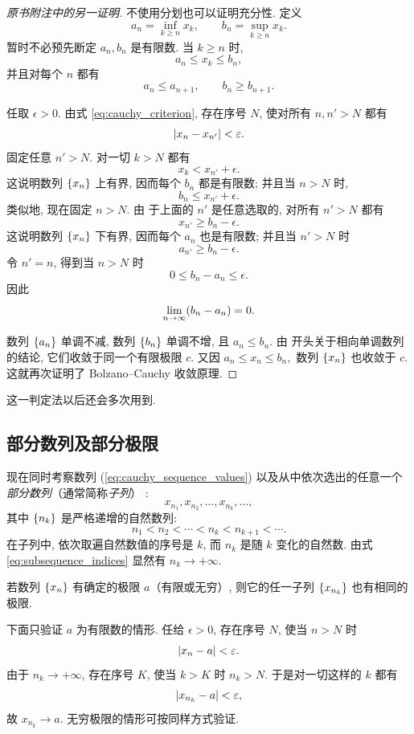 \begin{proof}[原书附注中的另一证明]
不使用分划也可以证明充分性. 定义
$$
a_n=\inf_{k\geqslant n}x_k,\qquad
b_n=\sup_{k\geqslant n}x_k.
$$
暂时不必预先断定 $a_n,b_n$ 是有限数.
当 $k\geqslant n$ 时,
$$
a_n\leqslant x_k\leqslant b_n,
$$
并且对每个 $n$ 都有
$$
a_n\leqslant a_{n+1},\qquad
b_n\geqslant b_{n+1}.
$$

任取 $\epsilon>0$.
由式 \eqref{eq:cauchy_criterion}, 存在序号 $N$, 使对所有 $n,n'>N$ 都有
$$
\abs{x_n-x_{n'}}<\epsilon.
$$
固定任意 $n'>N$. 对一切 $k>N$ 都有
$$
x_k<x_{n'}+\epsilon.
$$
这说明数列 $\seqset{x}$ 上有界, 因而每个 $b_n$ 都是有限数;
并且当 $n>N$ 时,
$$
b_n\leqslant x_{n'}+\epsilon.
$$
类似地, 现在固定 $n>N$. 由
于上面的 $n'$ 是任意选取的, 对所有 $n'>N$ 都有
$$
x_{n'}\geqslant b_n-\epsilon.
$$
这说明数列 $\seqset{x}$ 下有界, 因而每个 $a_n$ 也是有限数;
并且当 $n'>N$ 时
$$
a_{n'}\geqslant b_n-\epsilon.
$$
令 $n'=n$, 得到当 $n>N$ 时
$$
0\leqslant b_n-a_n\leqslant\epsilon.
$$
因此
$$
\limto{n}(b_n-a_n)=0.
$$

数列 $\seqset{a}$ 单调不减, 数列 $\seqset{b}$ 单调不增,
且 $a_n\leqslant b_n$.
由  开头关于相向单调数列的结论,
它们收敛于同一个有限极限 $c$.
又因
$
a_n\leqslant x_n\leqslant b_n,
$
数列 $\seqset{x}$ 也收敛于 $c$.
这就再次证明了 Bolzano--Cauchy 收敛原理.
\end{proof}

这一判定法以后还会多次用到.

\subsection{部分数列及部分极限}\label{subsec:40}
现在同时考察数列 (\ref{eq:cauchy_sequence_values}) 以及从中依次选出的任意一个\emph{部分数列}（通常简称\emph{子列}）
:
\begin{equation}\label{eq:subsequence_terms}
x_{n_1},x_{n_2},\ldots,x_{n_k},\ldots,
\end{equation}
其中 $\seqset[k]{n}$ 是严格递增的自然数列:
\begin{equation}\label{eq:subsequence_indices}
n_1<n_2<\cdots<n_k<n_{k+1}<\cdots.
\end{equation}
在子列中, 依次取遍自然数值的序号是 $k$, 而 $n_k$ 是随 $k$ 变化的自然数.
由式 \eqref{eq:subsequence_indices} 显然有 $n_k\to+\infty$.

{\kaishu 若数列 $\seqset{x}$ 有确定的极限 $a$（有限或无穷）, 则它的任一子列
$\bbbrac{x_{n_k}}$ 也有相同的极限.}

下面只验证 $a$ 为有限数的情形.
任给 $\epsilon>0$, 存在序号 $N$, 使当 $n>N$ 时
$$
\abs{x_n-a}<\epsilon.
$$
由于 $n_k\to+\infty$, 存在序号 $K$, 使当 $k>K$ 时 $n_k>N$.
于是对一切这样的 $k$ 都有
$$
\abs{x_{n_k}-a}<\epsilon,
$$
故 $x_{n_k}\to a$. 无穷极限的情形可按同样方式验证.

